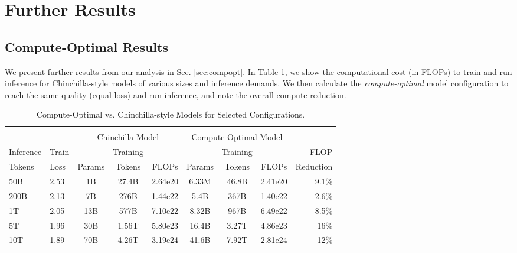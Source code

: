 \section{Further Results}
\subsection{Compute-Optimal Results}\label{sec:compoptappendix}
We present further results from our analysis in Sec. \ref{sec:compopt}. In Table \ref{table:computetable}, we show the computational cost (in FLOPs) to train and run inference for Chinchilla-style models of various sizes and inference demands. We then calculate the \textit{compute-optimal} model configuration to reach the same quality (equal loss) and run inference, and note the overall compute reduction.

\begin{table}
  \caption{Compute-Optimal vs. Chinchilla-style Models for Selected Configurations.}
  \label{table:computetable}
  \centering
  \begin{tabular}{llccccccr}
    \toprule
    & & & & & & & \\
    & & \multicolumn{3}{c}{Chinchilla Model} & \multicolumn{3}{c}{Compute-Optimal Model} \\
    \cmidrule(r){3-5} \cmidrule(r){6-8}
    Inference & Train & & Training &  &  & Training &  & FLOP
    \\ Tokens & Loss & Params & Tokens & FLOPs & Params & Tokens & FLOPs & Reduction\\
    \midrule
    50B & 2.53 & 1B & 27.4B  & 2.64e20 & 6.33M  & 46.8B & 2.41e20 & 9.1\%\\
    200B & 2.13 & 7B & 276B &  1.44e22   & 5.4B & 367B & 1.40e22 & 2.6\%    \\
    1T & 2.05 & 13B & 577B & 7.10e22 & 8.32B & 967B & 6.49e22 & 8.5\% \\
    5T & 1.96 & 30B & 1.56T  & 5.80e23 & 16.4B & 3.27T & 4.86e23 & 16\% \\
    10T & 1.89 & 70B     & 4.26T & 3.19e24 & 41.6B & 7.92T & 2.81e24 & 12\% \\
    \bottomrule
  \end{tabular}
\end{table}

